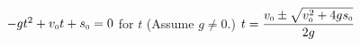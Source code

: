 {$-gt^{2} + v_{\mbox{\tiny $0$}}t + s_{\mbox{\tiny $0$}} = 0$ for $t$ (Assume $g \neq 0$.)}
{$t = \dfrac{v_{\mbox{\tiny $0$}} \pm \sqrt{v_{\mbox{\tiny $0$}}^{2} + 4gs_{\mbox{\tiny $0$}}}}{2g}  $}